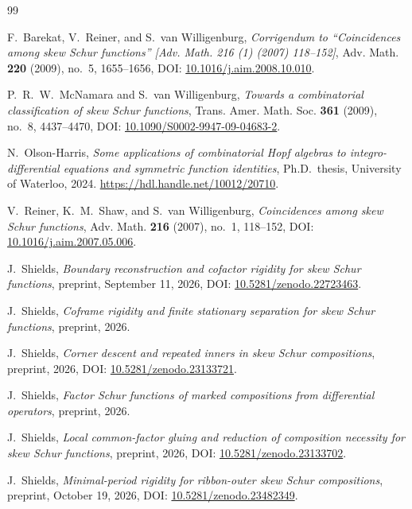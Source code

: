\documentclass[11pt,a4paper]{amsart}
\numberwithin{equation}{section}
\theoremstyle{plain}
\theoremstyle{definition}
\begin{document}
\begin{thebibliography}{99}

F.~Barekat, V.~Reiner, and S.~van Willigenburg,
\emph{Corrigendum to ``Coincidences among skew Schur functions'' [Adv. Math. 216 (1) (2007) 118--152]},
Adv. Math. \textbf{220} (2009), no.~5, 1655--1656,
DOI: \href{https://doi.org/10.1016/j.aim.2008.10.010}{10.1016/\allowbreak j.aim.2008.10.010}.

P.~R.~W.~McNamara and S.~van Willigenburg,
\emph{Towards a combinatorial classification of skew Schur functions},
Trans. Amer. Math. Soc. \textbf{361} (2009), no.~8, 4437--4470,
DOI: \href{https://doi.org/10.1090/S0002-9947-09-04683-2}{10.1090/\allowbreak S0002-9947-09-04683-2}.

N.~Olson-Harris,
\emph{Some applications of combinatorial Hopf algebras to integro-differential equations and symmetric function identities},
Ph.D.\ thesis, University of Waterloo, 2024.
\url{https://hdl.handle.net/10012/20710}.

V.~Reiner, K.~M.~Shaw, and S.~van Willigenburg,
\emph{Coincidences among skew Schur functions},
Adv. Math. \textbf{216} (2007), no.~1, 118--152,
DOI: \href{https://doi.org/10.1016/j.aim.2007.05.006}{10.1016/\allowbreak j.aim.2007.05.006}.

J.~Shields,
\emph{Boundary reconstruction and cofactor rigidity for skew Schur functions},
preprint, September 11, 2026,
DOI: \href{https://doi.org/10.5281/zenodo.22723463}{10.5281/\allowbreak zenodo.22723463}.

J.~Shields,
\emph{Coframe rigidity and finite stationary separation for skew Schur functions},
preprint, 2026.

J.~Shields,
\emph{Corner descent and repeated inners in skew Schur compositions},
preprint, 2026,
DOI: \href{https://doi.org/10.5281/zenodo.23133721}{10.5281/\allowbreak zenodo.23133721}.

J.~Shields,
\emph{Factor Schur functions of marked compositions from differential operators},
preprint, 2026.

J.~Shields,
\emph{Local common-factor gluing and reduction of composition necessity for skew Schur functions},
preprint, 2026,
DOI: \href{https://doi.org/10.5281/zenodo.23133702}{10.5281/\allowbreak zenodo.23133702}.

J.~Shields,
\emph{Minimal-period rigidity for ribbon-outer skew Schur compositions},
preprint, October 19, 2026,
DOI: \href{https://doi.org/10.5281/zenodo.23482349}{10.5281/\allowbreak zenodo.23482349}.

\end{thebibliography}
\end{document}
